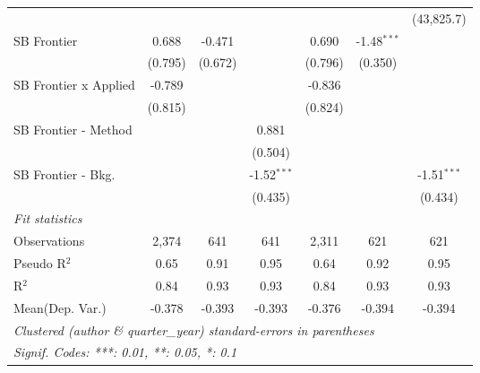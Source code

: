\begin{tabular}{lcccccc}
                                  &               &              &               &                &               & (43,825.7)\\   
   SB Frontier                    & 0.688         & -0.471       &               & 0.690          & -1.48$^{***}$ &   \\   
                                  & (0.795)       & (0.672)      &               & (0.796)        & (0.350)       &   \\   
   SB Frontier x Applied          & -0.789        &              &               & -0.836         &               &   \\   
                                  & (0.815)       &              &               & (0.824)        &               &   \\   
   SB Frontier - Method           &               &              & 0.881         &                &               &   \\   
                                  &               &              & (0.504)       &                &               &   \\   
   SB Frontier - Bkg.             &               &              & -1.52$^{***}$ &                &               & -1.51$^{***}$\\   
                                  &               &              & (0.435)       &                &               & (0.434)\\   
   \midrule
   \emph{Fit statistics}\\
   Observations                   & 2,374         & 641          & 641           & 2,311          & 621           & 621\\  
   Pseudo R$^2$                   & 0.65          & 0.91         & 0.95          & 0.64           & 0.92          & 0.95\\  
   R$^2$                          & 0.84          & 0.93         & 0.93          & 0.84           & 0.93          & 0.93\\  
Mean(Dep. Var.) & -0.378 & -0.393 & -0.393 & -0.376 & -0.394 & -0.394 \\
   \midrule \midrule
   \multicolumn{7}{l}{\emph{Clustered (author \& quarter\_year) standard-errors in parentheses}}\\
   \multicolumn{7}{l}{\emph{Signif. Codes: ***: 0.01, **: 0.05, *: 0.1}}\\
\end{tabular}
\par\endgroup

